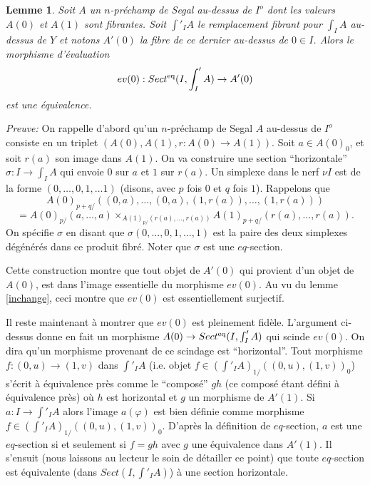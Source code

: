 \documentclass[12pt]{article}
\newtheorem{lemme}[lemma]{Lemme}
\begin{document}
\begin{lemme}
\label{casi}
Soit $A$ un $n$-pr\'echamp de Segal au-dessus de $I^o$ dont les valeurs
$A(0)$ et
$A(1)$ sont fibrantes. Soit $\int '_IA$ le remplacement fibrant pour $\int  _IA$
au-dessus de $Y$ et notons $A'(0)$ la fibre de ce dernier au-dessus de $0\in
I$. Alors le morphisme d'\'evaluation
$$
ev(0): Sect ^{\rm eq}(I, \int '_IA)\rightarrow A'(0)
$$
est une \'equivalence.
\end{lemme}
{\em Preuve:}
On rappelle d'abord qu'un $n$-pr\'echamp de Segal $A$ au-dessus de $I^o$
consiste
en un triplet $(A(0), A(1), r: A(0)\rightarrow A(1))$.
Soit $a\in A(0)_0$, et
soit $r(a)$ son image dans $A(1)$. On va construire une section
``horizontale''
$\sigma :I\rightarrow\int _IA$ qui envoie $0$ sur $a$ et $1$ sur $r(a)$. Un
simplexe dans le nerf $\nu I$ est de la forme $(0,\ldots , 0, 1, \ldots
1)$ (disons, avec $p$ fois $0$ et $q$ fois $1$).
Rappelons que
$$
A(0)_{p+q/}((0, a),\ldots , (0,a),(1,r(a)),\ldots , (1,r(a)))
$$
$$
= A(0)_{p/}(a,\ldots , a)\times _{A(1)_{p/}(r(a),\ldots , r(a))}
A(1)_{p+q/}(r(a),\ldots , r(a)).
$$
On sp\'ecifie $\sigma$ en disant que $\sigma (0,\ldots, 0, 1,\ldots , 1)$
est la paire des deux simplexes d\'eg\'en\'er\'es dans ce produit fibr\'e.
Noter que $\sigma$ est une $eq$-section.

Cette construction montre que tout objet de $A'(0)$ qui provient d'un objet de
$A(0)$, est dans l'image essentielle du morphisme $ev(0)$. Au vu du lemme
\ref{inchange}, ceci montre que $ev(0)$ est essentiellement surjectif.



Il reste maintenant \`a montrer que $ev(0)$ est pleinement fid\`ele.
L'argument ci-dessus donne en fait un morphisme $A(0)\rightarrow
Sect ^{\rm eq}(I, \int '_IA)$ qui scinde $ev(0)$.
On dira qu'un morphisme provenant de ce scindage est ``horizontal''.
Tout morphisme $f:(0,u)\rightarrow (1,v)$ dans $\int '_IA$
(i.e. objet  $f\in (\int '_IA)_{1/}((0,u),(1,v))_0$) s'\'ecrit \`a
\'equivalence pr\`es comme le ``compos\'e'' $gh$ (ce
compos\'e \'etant d\'efini \`a
\'equivalence pr\`es) o\`u $h$ est horizontal et $g$ un morphisme de $A'(1)$.
Si $a: I\rightarrow \int '_IA$ alors l'image $a(\varphi )$ est bien d\'efinie
comme morphisme $f\in (\int '_IA)_{1/}((0,u),(1,v))_0$. D'apr\`es la
d\'efinition de $eq$-section, $a$ est une $eq$-section si et seulement si
$f=gh$ avec $g$ une \'equivalence dans $A'(1)$. Il s'ensuit
(nous laissons au lecteur le soin de d\'etailler ce point) que toute
$eq$-section est \'equivalente (dans $Sect(I, \int '_IA)$) \`a une section
horizontale.
\end{document}
